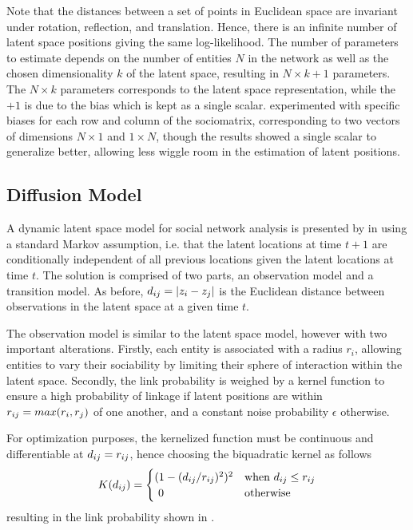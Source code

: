     Note that the distances between a set of points in Euclidean space are invariant under rotation, reflection, and translation. Hence, there is an infinite number of latent space positions giving the same log-likelihood. The number of parameters to estimate depends on the number of entities $N$ in the network as well as the chosen dimensionality $k$ of the latent space, resulting in $N \times k + 1$ parameters. The $N\times k$ parameters corresponds to the latent space representation, while the $+1$ is due to the bias which is kept as a single scalar. \citeauthor{jacobsen2018a} experimented with specific biases for each row and column of the sociomatrix, corresponding to two vectors of dimensions $N\times 1$ and $1\times N$, though the results showed a single scalar to generalize better, allowing less wiggle room in the estimation of latent positions.
    
\subsection{Diffusion Model}
    
    A dynamic latent space model for social network analysis is presented by \citeauthor{sarkar2005dynamic} in \cite{sarkar2005dynamic} using a standard Markov assumption, i.e. that the latent locations at time $t+1$ are conditionally independent of all previous locations given the latent locations at time $t$. The solution is comprised of two parts, an observation model and a transition model. As before, $\sub(d)=|z_i-z_j|$ is the Euclidean distance between observations in the latent space at a given time $t$.
    
    The observation model is similar to the latent space model, however with two important alterations. Firstly, each entity is associated with a radius $r_i$, allowing entities to vary their sociability by limiting their sphere of interaction within the latent space.
    Secondly, the link probability is weighed by a kernel function to ensure a high probability of linkage if latent positions are within $\sub(r)=max(r_i,r_j)$ of one another, and a constant noise probability $\epsilon$ otherwise.
    
    For optimization purposes, the kernelized function must be continuous and differentiable at $\sub(d)=\sub(r)$, hence choosing the biquadratic kernel as follows
    \begin{equation}\label{eq:biquadratic-kernel}
        K(\sub(d))=
        \begin{cases}
            (1-(\sub(d)/\sub(r))^2)^2 & \text{when } \sub(d) \leq \sub(r) \\
            \ 0 & \text{otherwise}
        \end{cases}
    \end{equation}
    resulting in the link probability shown in .
    
